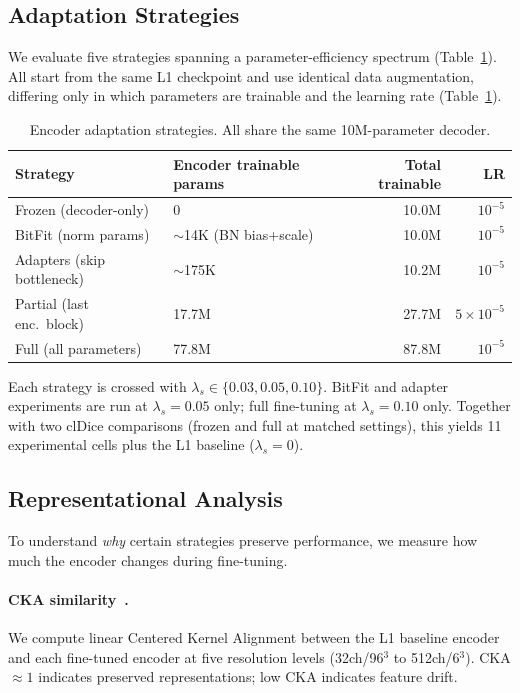 \documentclass[runningheads]{llncs}
\begin{document}
\subsection{Adaptation Strategies}
\label{sec:strategies}

We evaluate five strategies spanning a parameter-efficiency spectrum (Table~\ref{tab:strategies}).
All start from the same L1 checkpoint and use identical data augmentation, differing only in which parameters are trainable and the learning rate (Table~\ref{tab:strategies}).

\begin{table}[t]
\caption{Encoder adaptation strategies. All share the same 10M-parameter decoder.}
\label{tab:strategies}
\centering
\small
\begin{tabular}{llrr}
\toprule
Strategy & Encoder trainable params & Total trainable & LR \\
\midrule
Frozen (decoder-only)     & 0                        & 10.0M  & $10^{-5}$ \\
BitFit (norm params)      & ${\sim}$14K (BN bias+scale) & 10.0M  & $10^{-5}$ \\
Adapters (skip bottleneck)& ${\sim}$175K              & 10.2M  & $10^{-5}$ \\
Partial (last enc.\ block) & 17.7M                   & 27.7M  & $5{\times}10^{-5}$ \\
Full (all parameters)     & 77.8M                    & 87.8M  & $10^{-5}$ \\
\bottomrule
\end{tabular}
\end{table}

Each strategy is crossed with $\lambda_s \in \{0.03, 0.05, 0.10\}$.
BitFit and adapter experiments are run at $\lambda_s{=}0.05$ only; full fine-tuning at $\lambda_s{=}0.10$ only.
Together with two clDice comparisons (frozen and full at matched settings), this yields 11 experimental cells plus the L1 baseline ($\lambda_s{=}0$).

\subsection{Representational Analysis}

To understand \emph{why} certain strategies preserve performance, we measure how much the encoder changes during fine-tuning.

\paragraph{CKA similarity~\cite{kornblith_cka_2019}.}
We compute linear Centered Kernel Alignment between the L1 baseline encoder and each fine-tuned encoder at five resolution levels (32ch/96$^3$ to 512ch/6$^3$).
CKA${\approx}1$ indicates preserved representations; low CKA indicates feature drift.
\end{document}
